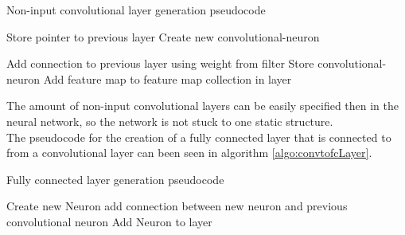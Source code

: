 \documentclass[10pt]{article}
\begin{document}
		\begin{algorithm}[h]
			\caption{Non-input convolutional layer generation pseudocode}
			\label{algo:noninputLayer}
			\begin{algorithmic}[1]
				\State Store pointer to previous layer
								\State Create new convolutional-neuron
								
										\State Add connection to previous layer using weight from filter										
									\EndFor									
								\EndFor
								\State Store convolutional-neuron
							\EndFor							
						\EndFor
						\State Add feature map to feature map collection in layer
					\EndFor					
				\EndFor
				
				\EndProcedure
			\end{algorithmic}
		\end{algorithm}
		The amount of non-input convolutional layers can be easily specified then in the neural network, so the network is not stuck to one static structure.\\		
		
		The pseudocode for the creation of a fully connected layer that is connected to from a convolutional layer can been seen in algorithm \ref{algo:convtofcLayer}. \\

		\begin{algorithm}[h]
			\caption{Fully connected layer generation  pseudocode}
			\label{algo:convtofcLayer}
			\begin{algorithmic}[1]
					Create new Neuron 
						\State add connection between new neuron and previous convolutional neuron
					\EndFor
					\State Add Neuron to layer
				\EndFor
				\EndProcedure
			\end{algorithmic}
		\end{algorithm}
		
\end{document}
